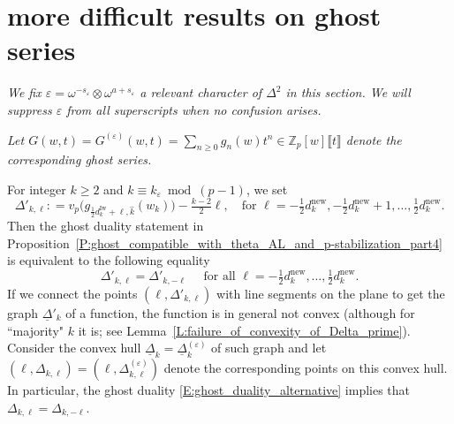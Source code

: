 \section{more difficult results on ghost series}
\begin{notation}
    \label{N:relevant_suppressed}
    \emph{We fix  $\varepsilon = \omega^{-s_\varepsilon} \otimes \omega^{a+s_\varepsilon}$ a relevant character of $\Delta^2$ in this section. We will suppress $\varepsilon$ from all superscripts when no confusion arises.}
\end{notation}

\begin{notation}
    \label{N:ghost_series_suppressed}
    \emph{Let $G(w,t) = G^{(\varepsilon)}(w,t) = \sum_{n\geq 0} g_n(w) t^n \in {\mathbb{Z}}_p[w]\llbracket t\rrbracket$ denote the corresponding ghost series.}
\end{notation}

\begin{notation}
    \label{N:Delta_kell}
    For integer $k \geq 2$ and $k \equiv k_\varepsilon \bmod{(p-1)}$, we set
    \begin{equation}
    \label{E:definition_of_Delta_prime}
    \Delta'_{k, \ell} : = v_p \big(g_{\frac 12 d_{k}^{\mathrm{Iw}}+\ell, \hat k}(w_k) \big) -\tfrac{k-2}2 \ell, \quad \textrm{for }\ell = -\tfrac 12 d_{k}^{\mathrm{new}}, -\tfrac 12 d_{k}^{\mathrm{new}}+1, \dots, \tfrac 12d_{k}^{{\mathrm{new}}}.
    \end{equation}
    Then the ghost duality statement in Proposition~\ref{P:ghost_compatible_with_theta_AL_and_p-stabilization_part4} is equivalent to the following
    equality
    \begin{equation}
    \label{E:ghost_duality_alternative}
    \Delta'_{k,\ell} = \Delta'_{{k}, -\ell} \quad\textrm{ for all }\ell = -\tfrac 12 d_{k}^{\mathrm{new}}, \dots, \tfrac 12d_{k}^{{\mathrm{new}}}.
    \end{equation}
    If we connect the points $(\ell, \Delta'_{k,\ell})$ with line segments on the plane to get the graph $\underline \Delta'_k$ of a function, the function is in general not convex (although for ``majority" $k$ it is; see Lemma~\ref{L:failure_of_convexity_of_Delta_prime}). Consider the convex hull $\underline \Delta_k = \underline \Delta^{(\varepsilon)}_k$ of such graph and let $(\ell, \Delta_{k, \ell}) = (\ell, \Delta^{(\varepsilon)}_{k, \ell})$ denote the corresponding points on this convex hull. In particular, the ghost duality \eqref{E:ghost_duality_alternative} implies that $\Delta_{k,\ell} = \Delta_{k, -\ell}$.
\end{notation}

